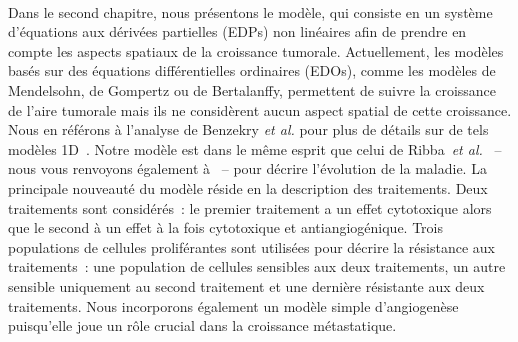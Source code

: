 \documentclass[main.tex]{subfiles}
\begin{document}
\paragraph{}
Dans le second chapitre, nous présentons le modèle, qui consiste en un système d'équations aux dérivées partielles (EDPs) non linéaires afin de prendre en compte les aspects spatiaux de la croissance tumorale. Actuellement, 
les modèles basés sur des équations différentielles ordinaires (EDOs), comme les modèles de Mendelsohn, de Gompertz ou de 
Bertalanffy, permettent de suivre la croissance de l'aire tumorale mais ils ne considèrent aucun aspect spatial de cette croissance. Nous en référons à l'analyse de Benzekry {\it et al.} pour plus de détails sur de tels modèles 1D~\cite{benzekry2014}. 
Notre modèle est dans le même esprit que celui de Ribba~{\it et
  al.}~\cite{Ribba2006532} -- nous vous renvoyons également à~\cite{Iollo2012,gallinato2014} -- pour décrire l'évolution de la maladie. La principale nouveauté du modèle réside en la description des traitements. Deux traitements sont considérés~: le premier traitement a un effet cytotoxique alors que le second à un effet à la fois cytotoxique et antiangiogénique. Trois populations de cellules proliférantes sont utilisées pour décrire la résistance aux traitements~: une population de cellules sensibles aux deux traitements, un autre sensible uniquement au second traitement et une dernière résistante aux deux traitements.  
Nous incorporons également un modèle simple d'angiogenèse puisqu'elle joue un rôle crucial dans la croissance métastatique.


\end{document}
